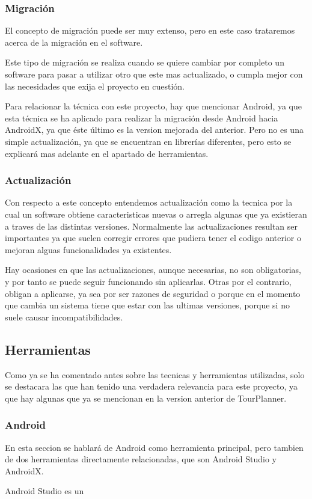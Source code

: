 \subsubsection{Migración}

El concepto de migración puede ser muy extenso, pero en este caso trataremos acerca de la migración en el software.

Este tipo de migración se realiza cuando se quiere cambiar por completo un software para pasar a utilizar otro que este mas actualizado, o cumpla mejor con las necesidades que exija el proyecto en cuestión. 

Para relacionar la técnica con este proyecto, hay que mencionar Android, ya que esta técnica se ha aplicado para realizar la migración desde Android hacia AndroidX, ya que éste último es la version mejorada del anterior. Pero no es una simple actualización, ya que se encuentran en librerías diferentes, pero esto se explicará mas adelante en el apartado de herramientas.

\subsubsection{Actualización}

Con respecto a este concepto entendemos actualización como la tecnica por la cual un software obtiene caracteristicas nuevas o arregla algunas que ya existieran a traves de las distintas versiones. Normalmente las actualizaciones resultan ser importantes ya que suelen corregir errores que pudiera tener el codigo anterior o mejoran alguas funcionalidades ya existentes.

Hay ocasiones en que las actualizaciones, aunque necesarias, no son obligatorias, y por tanto se puede seguir funcionando sin aplicarlas. Otras por el contrario, obligan a aplicarse, ya sea por ser razones de seguridad o porque en el momento que cambia un sistema tiene que estar con las ultimas versiones, porque si no suele causar incompatibilidades.

\subsection{Herramientas}

Como ya se ha comentado antes sobre las tecnicas y herramientas utilizadas, solo se destacara las que han tenido una verdadera relevancia para este proyecto, ya que hay algunas que ya se mencionan en la version anterior de TourPlanner.

\subsubsection{Android}

En esta seccion se hablará de Android como herramienta principal, pero tambien de dos herramientas directamente relacionadas, que son Android Studio y AndroidX.

Android Studio es un 




